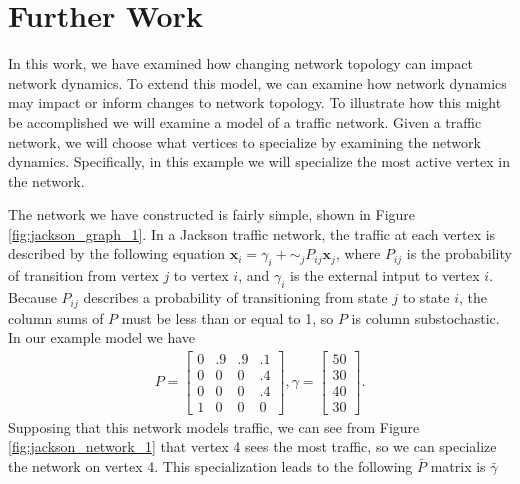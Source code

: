\documentclass[12pt]{thesis}
\begin{document}
\chapter{Further Work}\label{chapt:further_work}
In this work, we have examined how changing network topology can impact network dynamics.
To extend this model, we can examine how network dynamics may impact or inform changes to network topology.
To illustrate how this might be accomplished we will examine a model of a traffic network. Given a traffic network, we will choose what vertices to specialize by examining the network dynamics.
Specifically, in this example we will specialize the most active vertex in the network.

The network we have constructed is fairly simple, shown in Figure \ref{fig:jackson_graph_1}.
In a Jackson traffic network, the traffic at each vertex is described by the following equation $\mathbf{x}_i = \gamma_i + \sim_{j}P_{ij}\mathbf{x}_j$, where $P_{ij}$ is the probability of transition from vertex $j$ to vertex $i$, and $\gamma_i$ is the external intput to vertex $i$.
Because $P_{ij}$ describes a probability of transitioning from state $j$ to state $i$, the column sums of $P$ must be less than or equal to 1, so $P$ is column substochastic.
In our example model we have 
\begin{align*}
    P =
    \begin{bmatrix}
        0  & .9  & .9  & .1 \\
        0  &  0  &  0  & .4 \\
        0  &  0  &  0  & .4 \\
        1  &  0  &  0  &  0
    \end{bmatrix},
    \gamma = \begin{bmatrix} 50 \\ 30 \\ 40 \\ 30 \end{bmatrix}.
\end{align*}
Supposing that this network models traffic, we can see from Figure \ref{fig:jackson_network_1} that vertex 4 sees the most traffic, so we can specialize the network on vertex 4. This specialization leads to the following $\bar{P}$ matrix is $\bar{\gamma}$
\end{document}
